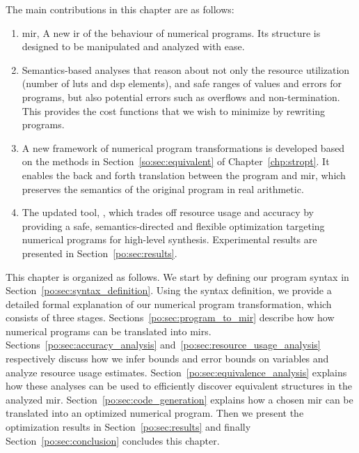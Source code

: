 The main contributions in this chapter are as follows:
\begin{enumerate}

    \item \acrfull{mir}, A new \gls{ir} of the behaviour of numerical programs.
    Its structure is designed to be manipulated and analyzed with ease.

    \item Semantics-based analyses that reason about not only the resource
    utilization (number of \glspl{lut} and \gls{dsp} elements), and safe ranges
    of values and errors for programs, but also potential errors such as
    overflows and non-termination.  This provides the cost functions that we
    wish to minimize by rewriting programs.

    \item A new framework of numerical program transformations is
    developed based on the methods in Section~\ref{so:sec:equivalent} of
    Chapter~\ref{chp:stropt}.  It enables the back and forth translation
    between the program and \gls{mir}, which preserves the semantics of the
    original program in real arithmetic.

    \item The updated tool, \soap, which trades off resource usage and accuracy
    by providing a safe, semantics-directed and flexible optimization targeting
    numerical programs for high-level synthesis.  Experimental results are
    presented in Section~\ref{po:sec:results}.

\end{enumerate}

This chapter is organized as follows.  We start by defining our
program syntax in Section~\ref{po:sec:syntax_definition}.  Using the
syntax definition, we provide a detailed formal explanation of our
numerical program transformation, which consists of three stages.
Sections~\ref{po:sec:program_to_mir} describe how how numerical programs can
be translated into \glspl{mir}.  Sections~\ref{po:sec:accuracy_analysis}
and~\ref{po:sec:resource_usage_analysis} respectively discuss how we infer
bounds and error bounds on variables and analyze resource usage estimates.
Section~\ref{po:sec:equivalence_analysis} explains how these analyses can
be used to efficiently discover equivalent structures in the analyzed
\gls{mir}\@.  Section~\ref{po:sec:code_generation} explains how a chosen
\gls{mir} can be translated into an optimized numerical program.  Then we
present the optimization results in Section~\ref{po:sec:results} and finally
Section~\ref{po:sec:conclusion} concludes this chapter.
